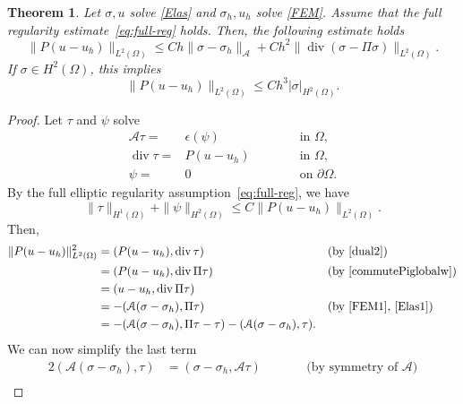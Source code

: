 \documentclass[12pt]{amsart}
\numberwithin{equation}{section}
\DeclareMathOperator{\divg}{div}
\newtheorem{theorem}{Theorem}[section]
\theoremstyle{definition}
\theoremstyle{remark}
\newcommand{\om}{{\Omega}}
\renewcommand{\(}{\bigl(}
\renewcommand{\)}{\bigr)}
\newcommand{\dive}{{\ensuremath\mathop{\mathrm{div}\,}}} %
\newcommand{\Aa}{\mathcal{A}}
\begin{document}
\begin{theorem}
  \label{thm:errorprojsuperconv}
  Let $\sigma, u$ solve \eqref{Elas} and $\sigma_h, u_h$ solve \eqref{FEM}. Assume that the full regularity estimate~\eqref{eq:full-reg} holds.
  Then, the following estimate holds
\begin{equation}
  \label{Pu-estimate}
    \| P(u-u_h)\|_{L^2(\Omega)} \le   C h
    \| \sigma-\sigma_h\|_{\Aa} + C h^2 \| \divg(\sigma-\Pi \sigma)\|_{L^2(\Omega)}. 
  \end{equation}
  If  $\sigma \in H^2(\om)$, this implies
  \begin{equation}
    \label{Pu-estimate-2}
    \| P(u-u_h)\|_{L^2(\Omega)} \le   C h^3     |\sigma|_{H^2(\om)}.
  \end{equation}
\end{theorem}
\begin{proof}
Let $\tau$ and $\psi$ solve
\begin{subequations}\label{dual}
\begin{alignat}{2}
\Aa \tau=& \epsilon (\psi) \qquad && \text{ in } \Omega,  \label{dual1}\\
\divg \tau=& P(u-u_h) \qquad  && \text{ in } \Omega, \label{dual2}\\
\psi=& 0 \qquad && \text{ on }  \partial \Omega. \label{dual3}
\end{alignat}
\end{subequations}
By the full elliptic regularity assumption~\eqref{eq:full-reg}, we have
\begin{equation}\label{ellipticreg}
\| \tau\|_{H^1(\Omega)}+ \|\psi\|_{H^2(\Omega)} \le C \| P(u-u_h)\|_{L^2(\Omega)}.
\end{equation}
Then, 
\begin{alignat*}{2}
\| P(u-u_h)\|_{L^2(\Omega)}^2& = ( P(u-u_h), \divg  \tau)  \qquad  && \text{(by \eqref{dual2})} \\
& =  ( P(u-u_h), \dive  \Pi \tau) \qquad  && \text{(by \eqref{commutePiglobalw})}  \\
& =  ( u-u_h, \dive  \Pi \tau) \qquad %
  \\
& =  -( \mathcal{A}(\sigma-\sigma_h), \Pi \tau)  \qquad && \text{(by \eqref{FEM1}, \eqref{Elas1})}  \\
& = -( \mathcal{A}(\sigma-\sigma_h), \Pi \tau- \tau)-( \mathcal{A} (\sigma-\sigma_h),  \tau).
\end{alignat*}
We can now simplify the last term
\begin{alignat*}{2}
    ( \mathcal{A} (\sigma-\sigma_h),  \tau)& =  ( \sigma-\sigma_h, \mathcal{A} \tau) \qquad && \text{(by symmetry of $\Aa$)} \\

\end{alignat*}
\end{proof}
\end{document}
